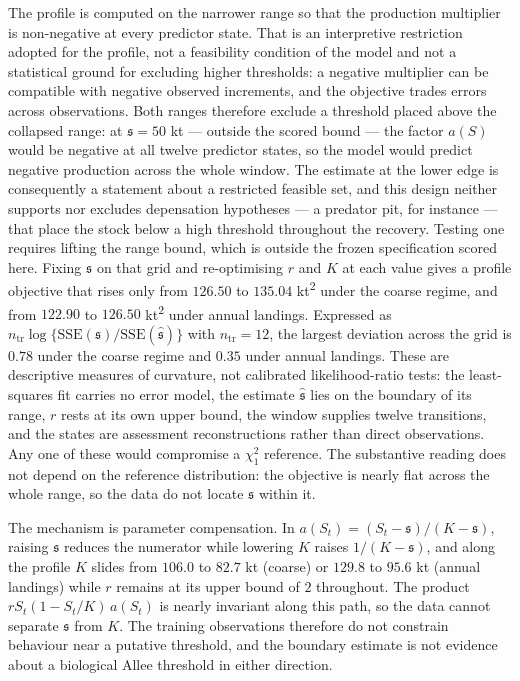 \documentclass[11pt]{article}
\begin{document}
The profile is computed on the narrower range so that the production
multiplier is non-negative at every predictor state. That is an
interpretive restriction adopted for the profile, not a feasibility
condition of the model and not a statistical ground for excluding higher
thresholds: a negative multiplier can be compatible with negative
observed increments, and the objective trades errors across
observations. Both ranges therefore exclude
a threshold placed above the collapsed range: at \(\mathfrak s = 50\) kt
--- outside the scored bound --- the factor \(a(S)\) would be negative
at all twelve predictor states, so the model would predict negative
production across the whole window. The estimate at the lower edge is
consequently a statement about a restricted feasible set, and this
design neither supports nor excludes depensation hypotheses --- a
predator pit, for instance --- that place the stock below a high
threshold throughout the recovery. Testing one requires lifting the
range bound, which is outside the frozen specification scored here. Fixing
\(\mathfrak s\) on that grid and re-optimising \(r\) and \(K\) at each
value gives a profile objective that rises only from \(126.50\) to
\(135.04\) kt\textsuperscript{2} under the coarse regime, and from
\(122.90\) to \(126.50\) kt\textsuperscript{2} under annual landings. Expressed as
\(n_{\mathrm{tr}}\log\{\mathrm{SSE}(\mathfrak s)/
\mathrm{SSE}(\hat{\mathfrak s})\}\) with \(n_{\mathrm{tr}}=12\), the
largest deviation across the grid is \(0.78\) under the coarse regime
and \(0.35\) under annual landings. These are descriptive measures of curvature, not calibrated
likelihood-ratio tests:
the least-squares fit carries no error model, the estimate
\(\hat{\mathfrak s}\) lies on the boundary of its range, \(r\) rests
at its own upper bound, the window supplies twelve transitions, and the
states are assessment reconstructions rather than direct observations.
Any one of these would compromise a \(\chi^2_1\) reference. The
substantive reading does not depend on the reference distribution: the
objective is nearly flat across the whole range, so the data do not
locate \(\mathfrak s\) within it.

The mechanism is parameter compensation. In
\(a(S_t)=(S_t-\mathfrak s)/(K-\mathfrak s)\), raising \(\mathfrak s\)
reduces the numerator while lowering \(K\) raises \(1/(K-\mathfrak s)\),
and along the profile \(K\) slides from \(106.0\) to \(82.7\) kt
(coarse) or \(129.8\) to \(95.6\) kt (annual landings) while \(r\)
remains at its upper bound of \(2\) throughout. The product
\(rS_t(1-S_t/K)\,a(S_t)\) is nearly invariant along this path, so the
data cannot separate \(\mathfrak s\) from \(K\). The training
observations therefore do not constrain behaviour near a putative
threshold, and the boundary estimate is not evidence about a biological
Allee threshold in either direction.
\end{document}
